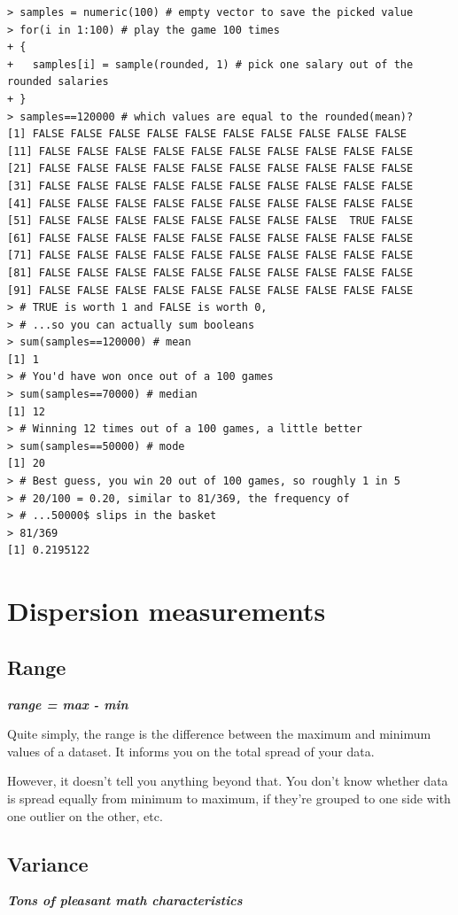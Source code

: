 \documentclass{report}
\newcommand{\notefor}[1]{\hfill\textbf{\textit{#1}}}
\begin{document}
		\begin{verbatim}
> samples = numeric(100) # empty vector to save the picked value
> for(i in 1:100) # play the game 100 times
+ {
+   samples[i] = sample(rounded, 1) # pick one salary out of the rounded salaries
+ }
> samples==120000 # which values are equal to the rounded(mean)?
[1] FALSE FALSE FALSE FALSE FALSE FALSE FALSE FALSE FALSE FALSE
[11] FALSE FALSE FALSE FALSE FALSE FALSE FALSE FALSE FALSE FALSE
[21] FALSE FALSE FALSE FALSE FALSE FALSE FALSE FALSE FALSE FALSE
[31] FALSE FALSE FALSE FALSE FALSE FALSE FALSE FALSE FALSE FALSE
[41] FALSE FALSE FALSE FALSE FALSE FALSE FALSE FALSE FALSE FALSE
[51] FALSE FALSE FALSE FALSE FALSE FALSE FALSE FALSE  TRUE FALSE
[61] FALSE FALSE FALSE FALSE FALSE FALSE FALSE FALSE FALSE FALSE
[71] FALSE FALSE FALSE FALSE FALSE FALSE FALSE FALSE FALSE FALSE
[81] FALSE FALSE FALSE FALSE FALSE FALSE FALSE FALSE FALSE FALSE
[91] FALSE FALSE FALSE FALSE FALSE FALSE FALSE FALSE FALSE FALSE
> # TRUE is worth 1 and FALSE is worth 0, 
> # ...so you can actually sum booleans
> sum(samples==120000) # mean
[1] 1
> # You'd have won once out of a 100 games
> sum(samples==70000) # median
[1] 12
> # Winning 12 times out of a 100 games, a little better
> sum(samples==50000) # mode
[1] 20
> # Best guess, you win 20 out of 100 games, so roughly 1 in 5
> # 20/100 = 0.20, similar to 81/369, the frequency of
> # ...50000$ slips in the basket
> 81/369
[1] 0.2195122
	\end{verbatim}
		
	\section{Dispersion measurements}\label{sec:dispersion}
		\subsection{Range}
		\notefor{range = max - min}
		
		Quite simply, the range is the difference between the maximum and minimum values of a dataset. It informs you on the total spread of your data.
		
		However, it doesn't tell you anything beyond that. You don't know whether data is spread equally from minimum to maximum, if they're grouped to one side with one outlier on the other, etc.
		
		\subsection{Variance}
		\notefor{Tons of pleasant math characteristics}
		
\end{document}
